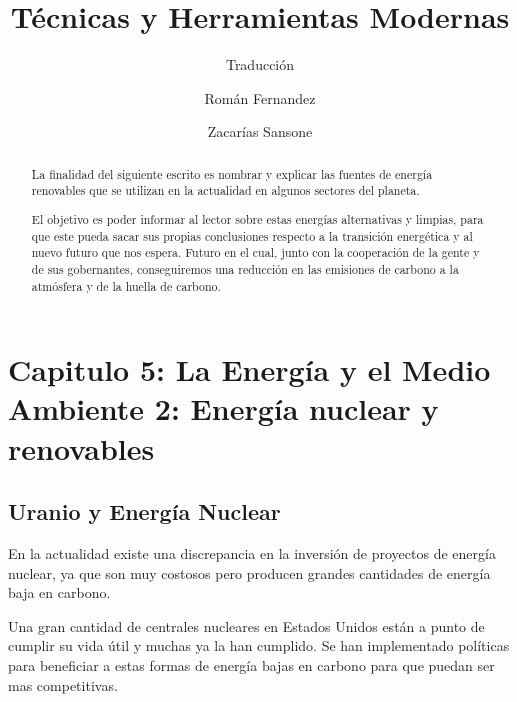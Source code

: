 \documentclass[runningheads]{llncs}
\begin{document}
%
\title{Técnicas y Herramientas Modernas}

\subtitle {Traducción}
%
%
\author{Román Fernandez \and
Zacarías Sansone}
%
%

%
\maketitle              %
%
\begin{abstract}
La finalidad del siguiente escrito es nombrar y explicar las fuentes de energía renovables que se utilizan en la actualidad en algunos sectores del planeta. 

El objetivo es poder informar al lector sobre estas energías alternativas y limpias, para que este pueda sacar sus propias conclusiones respecto a la transición energética y al nuevo futuro que nos espera. Futuro en el cual, junto con la cooperación de la gente y de sus gobernantes, conseguiremos una reducción en las emisiones de carbono a la atmósfera y de la huella de carbono.

\end{abstract}
%
%
%
\section{Capitulo 5: La Energía y el Medio Ambiente 2: Energía nuclear y renovables}
\subsection{Uranio y Energía Nuclear}

En la actualidad existe una discrepancia en la inversión de proyectos de energía nuclear, ya que son muy costosos pero producen grandes cantidades de energía baja en carbono.

Una gran cantidad de centrales nucleares en Estados Unidos están a punto de cumplir su vida útil y muchas ya la han cumplido. Se han implementado políticas para beneficiar a estas formas de energía bajas en carbono para que puedan ser mas competitivas.
\end{document}
